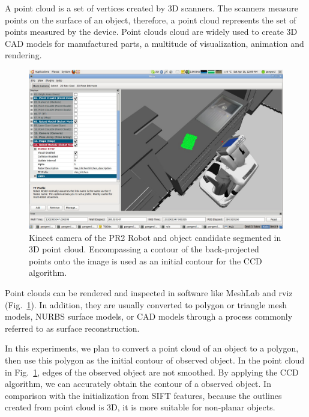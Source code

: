 A point cloud is a set of vertices created by 3D
scanners. The scanners measure points on the surface of an object,
therefore, a point cloud represents the set of points measured by the
device. Point clouds cloud are widely used to  create 3D CAD models
for manufactured parts, a multitude of visualization, animation and
rendering.
\begin{figure}[htb]
  \centering
  \includegraphics[width=\linewidth]{images/pr2b.jpg}
  \caption[Kinect camera of the PR2 Robot and object candidate
  segmented in 3D point cloud.]{Kinect camera of
    the PR2 Robot and object candidate segmented in 3D point
    cloud. Encompassing a contour of the back-projected points onto
    the image is used as an initial contour for the CCD algorithm.}
  \label{fig:pointcloud}
\end{figure}

Point clouds can be rendered and inspected in software like MeshLab
and rviz (Fig.~\ref{fig:pointcloud}). In addition, they are usually converted to polygon or
triangle mesh models, NURBS surface models, or CAD models through a
process commonly referred to as surface reconstruction.

In this experiments, we plan to convert a point cloud of an object to a
polygon, then use this polygon as the initial contour of observed
object. In the point cloud in Fig.~\ref{fig:pointcloud}, edges of
the observed object are not smoothed. By applying the CCD algorithm,
we can accurately obtain the contour of a observed object. In
comparison with the initialization from SIFT features, because the
outlines created from point cloud is 3D, it is more
suitable for non-planar objects.
